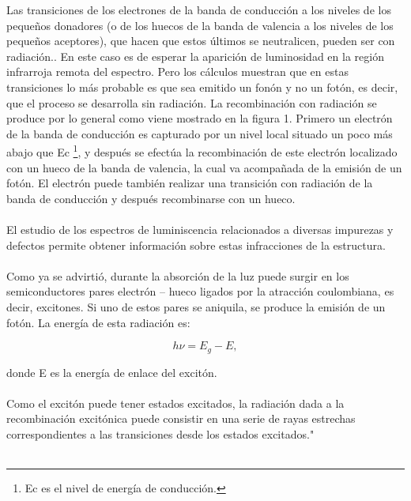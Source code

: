\documentclass[12]{article}
\begin{document}
\begin{multicols}{2}
Las transiciones de los electrones de la banda de conducción a los niveles de los pequeños donadores (o de los huecos de la banda de valencia a los niveles de los pequeños aceptores),  que hacen que estos últimos se neutralicen, pueden ser con radiación.. En este caso es de esperar la aparición de luminosidad en la región infrarroja remota del espectro. Pero los cálculos  muestran que en estas transiciones lo más probable es que sea emitido un fonón y no un fotón, es decir, que el proceso se desarrolla sin radiación. La recombinación con radiación se produce por lo general  como viene mostrado en la figura 1. Primero un electrón de la banda de conducción es capturado por un nivel local situado un poco más abajo que Ec  \footnote{Ec es el nivel de energía de conducción.}, y después se efectúa la recombinación de este electrón localizado con un hueco de la banda de valencia, la cual va acompañada de la emisión de un fotón. El electrón puede también realizar una transición con radiación de la banda de conducción y después recombinarse con un hueco. \\ \\
El estudio de los espectros de luminiscencia relacionados a diversas impurezas y defectos permite obtener información sobre estas infracciones de la estructura. \\ \\

Como ya se advirtió, durante la absorción de la luz puede surgir en los semiconductores pares electrón – hueco ligados por la atracción coulombiana, es decir, excitones. Si uno de estos pares se aniquila, se produce la emisión de un fotón. La energía de esta radiación es: 

\begin{equation}
h\nu = E_g - E,
\end{equation}

donde E es la energía de enlace del excitón. \\ \\
Como el excitón puede tener estados excitados, la radiación dada a la recombinación excitónica puede consistir en una serie de rayas estrechas correspondientes a las transiciones desde los estados excitados." \cite{ESTADO_SOLIDO} \\ \\


\end{multicols}
\end{document}
